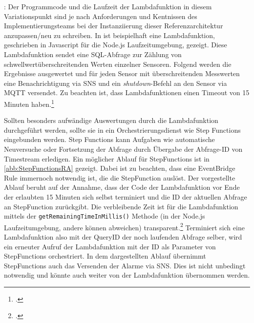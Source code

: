 : Der Programmcode und die Laufzeit der Lambdafunktion in diesem Variationspunkt sind je nach Anforderungen und Kentnissen des Implementierungsteams bei der Instanziierung dieser Referenzarchitektur anzupassen/neu zu schreiben. In  ist beispielhaft eine Lambdafunktion, geschrieben in Javascript für die Node.js Laufzeitumgebung, gezeigt. Diese Lambdafunktion sendet eine \ac{SQL}-Abfrage zur Zählung von schwellwertüberschreitenden Werten einzelner Sensoren. Folgend werden die Ergebnisse ausgewertet und für jeden Sensor mit überschreitenden Messwerten eine Benachrichtigung via SNS und ein \textit{shutdown}-Befehl an den Sensor via \ac{MQTT} versendet. Zu beachten ist, dass Lambdafunktionen einen Timeout von 15 Minuten haben.\footcite[Vgl.][]{AmazonWebServicesInc..o.J.bv} 

Sollten besonders aufwändige Auswertungen durch die Lambdafunktion durchgeführt werden, sollte sie in ein Orchestrierungsdienst wie Step Functions eingebunden werden. Step Functions kann Aufgaben wie automatische Neuversuche oder Fortsetzung der Abfrage durch Übergabe der Abfrage-ID von Timestream erledigen. Ein möglicher Ablauf für StepFunctions ist in \autoref{abb:StepFunctionsRA} gezeigt. Dabei ist zu beachten, dass eine EventBridge Rule immernoch notwendig ist, die die StepFunction auslöst. Der vorgestellte Ablauf beruht auf der Annahme, dass der Code der Lambdafunktion vor Ende der erlaubten 15 Minuten sich selbst terminiert und die ID der aktuellen Abfrage an StepFunction zurückgibt. Die verbleibende Zeit ist für die Lambdafunktion mittels der \texttt{getRemainingTimeInMillis()} Methode (in der Node.js Laufzeitumgebung, andere können abweichen) transparent.\footcite[Vgl.][]{AmazonWebServicesInc..o.J.bw} Terminiert sich eine Lambdafunktion also mit der QueryID der noch laufenden Abfrage selber, wird ein erneuter Aufruf der Lambdafunktion mit der ID als Parameter von StepFunctions orchestriert. In dem dargestellten Ablauf übernimmt StepFunctions auch das Versenden der Alarme via \ac{SNS}. Dies ist nicht unbedingt notwendig und könnte auch weiter von der Lambdafunktion übernommen werden.

